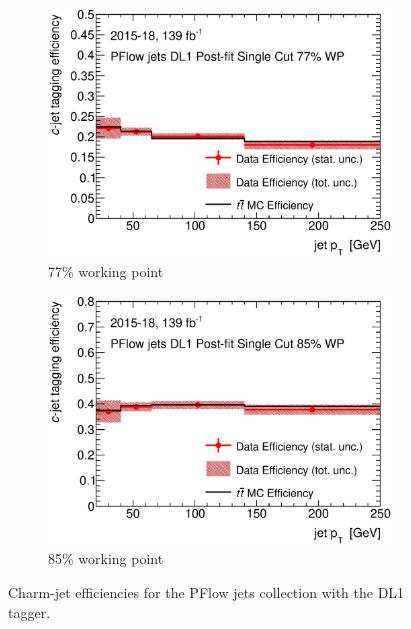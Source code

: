 \begin{figure}[H]
\begin{subfigure}[t]{.35\linewidth}
\includegraphics[width=1\textwidth]{FTAG_plots/DL1allPFlowDec/eff77.eps}
\caption{77\% working point}
\end{subfigure}
\begin{subfigure}[t]{.35\linewidth}
\includegraphics[width=1\textwidth]{FTAG_plots/DL1allPFlowDec/eff85.eps}
\caption{85\% working point}
\end{subfigure}
\caption{Charm-jet efficiencies for the PFlow jets collection with
the DL1 tagger.} \label{fig:Dec_eff_PFlow_DL1}
\end{figure}

